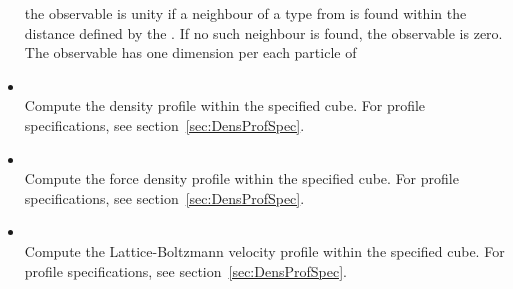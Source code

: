 \begin{itemize}
          the observable is unity if a neighbour of a type from 
           is found within the distance 
          defined by the . If no such neighbour is found, the 
          observable is zero. The observable has one dimension per each 
          particle of 
    \item {}    \\
          Compute the density profile within the specified cube.
          For profile specifications, see section~\ref{sec:DensProfSpec}.
\item {}    \\
          Compute the force density profile within the specified cube.
          For profile specifications, see section~\ref{sec:DensProfSpec}.
    \item {}    \\
          Compute the Lattice-Boltzmann velocity profile within the specified cube.
          For profile specifications, see section~\ref{sec:DensProfSpec}.


\end{itemize}
